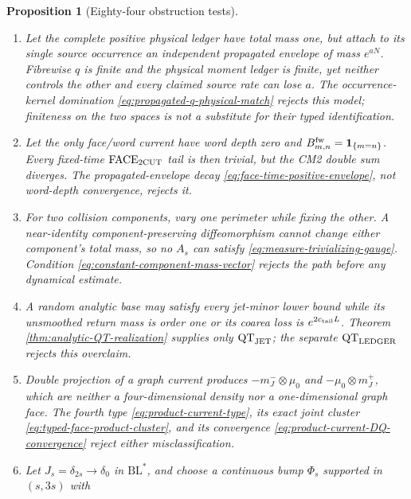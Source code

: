 \documentclass[11pt]{article}
\newtheorem{proposition}[theorem]{Proposition}
\newcommand{\one}{\mathbf 1}
\begin{document}
\begin{proposition}[Eighty-four obstruction tests]
\begin{enumerate}[label=\textup{(T\arabic*)}]
      component choice is non-Borel.  Then neither the marked kernel nor
      Tonelli assembly is defined.  The standard-Borel measurable component
      extension in Definition~\ref{lem:measurable-positive-decomposition} rejects
      this model before any signed recombination.
\item Let the complete positive physical ledger have total mass one, but
      attach to its single source occurrence an independent propagated
      envelope of mass $e^{aN}$.  Fibrewise $q$ is finite and the physical
      moment ledger is finite, yet neither controls the other and every
      claimed source rate can lose $a$.  The occurrence-kernel domination
      \eqref{eq:propagated-q-physical-match} rejects this model; finiteness on
      the two spaces is not a substitute for their typed identification.
\item Let the only face/word current have word depth zero and
      $B_{m,n}^{\rm fw}=\one_{\{m=n\}}$.  Every fixed-time
      $\mathrm{FACE}_{\rm 2CUT}$ tail is then trivial, but the CM2 double sum
      diverges.  The propagated-envelope decay
      \eqref{eq:face-time-positive-envelope}, not word-depth convergence,
      rejects it.
\item For two collision components, vary one perimeter while fixing the
      other.  A near-identity component-preserving diffeomorphism cannot
      change either component's total mass, so no $A_s$ can satisfy
      \eqref{eq:measure-trivializing-gauge}.  Condition
      \eqref{eq:constant-component-mass-vector} rejects the path before any
      dynamical estimate.
\item A random analytic base may satisfy every jet-minor lower bound while
      its unsmoothed return mass is order one or its coarea loss is
      $e^{2c_{\rm tail}L}$.  Theorem
      \ref{thm:analytic-QT-realization} supplies only
      $\mathrm{QT}_{\rm JET}$; the separate
      $\mathrm{QT}_{\rm LEDGER}$ rejects this overclaim.
\item Double projection of a graph current produces
      $-m_J^-\otimes\mu_0$ and $-\mu_0\otimes m_J^+$, which are neither a
      four-dimensional density nor a one-dimensional graph face.  The fourth
      type \eqref{eq:product-current-type}, its exact joint cluster
      \eqref{eq:typed-face-product-cluster}, and its convergence
      \eqref{eq:product-current-DQ-convergence} reject either
      misclassification.
\item Let $J_s=\delta_{2s}\to\delta_0$ in $\mathrm{BL}^*$, and choose a
      continuous bump $\Phi_s$ supported in $(s,3s)$ with

\end{enumerate}
\end{proposition}
\end{document}
